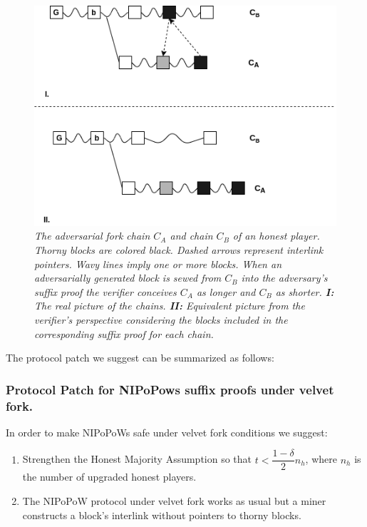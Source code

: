 \begin{figure}[h!]
	\begin{center}
		\includegraphics[scale=0.5]{figures/injection.png}
	\end{center}
	\caption{\textit{The adversarial fork chain $C_A$ and chain $C_B$ of an honest
	player. Thorny blocks are colored black. Dashed arrows represent interlink
	pointers. Wavy lines imply one or more blocks. When an adversarially generated
	block is sewed from $C_B$ into the adversary's suffix proof the verifier
	conceives $C_A$ as longer and $C_B$ as shorter.  \textbf{I:} The real picture
	of the chains. \textbf{II:} Equivalent picture from the verifier's perspective
	considering the blocks included in the corresponding suffix proof for each chain.}}
	\label{fig:injection}
\end{figure}


The protocol patch we suggest can be summarized as follows:\\


\subsubsection*{Protocol Patch for NIPoPows suffix proofs under velvet fork.} In order
to make NIPoPoWs safe under velvet fork conditions we suggest:
\begin{enumerate}
\item Strengthen the Honest Majority Assumption so that $t < \dfrac{1 - \delta}{2}n_h$,
where $n_h$ is the number of upgraded honest players.
\item The NIPoPoW protocol under velvet fork works as usual but a miner constructs
a block's interlink without pointers to thorny blocks.
\end{enumerate}


